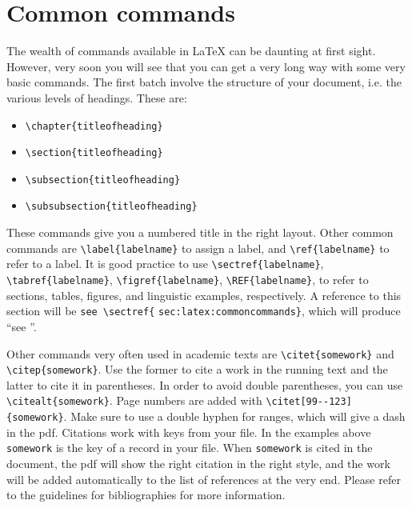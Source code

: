\section{Common commands}\label{sec:latex:commoncommands}
The wealth of commands available in \LaTeX\xspace can be daunting at first sight. However, very soon you will see that you can get a very long way with some very basic commands. The first batch involve the structure of your document, i.e. the various levels of headings. These are:
\begin{itemize}
\item \verb+\chapter{titleofheading}+
\item \verb+\section{titleofheading}+
\item \verb+\subsection{titleofheading}+
\item \verb+\subsubsection{titleofheading}+
\end{itemize}

These commands give you a numbered title in the right layout.
Other common commands are 
\verb+\label{labelname}+ 
to assign a label, and 
\verb+\ref{labelname}+
to refer to a label. It is good practice to use 
\verb+\sectref{labelname}+,
\verb+\tabref{labelname}+,
\verb+\figref{labelname}+,
\verb+\REF{labelname}+,
to refer to sections, tables, figures, and linguistic examples, respectively. A reference to this section will be \verb+see \sectref{+ \verb+sec:latex:commoncommands}+, which will produce ``see ''.

Other commands very often used in academic texts are \verb+\citet{somework}+ and \verb+\citep{somework}+. Use the former to cite a work in the running text and the latter to cite it in parentheses. In order to avoid double parentheses, you can use  \verb+\citealt{somework}+. Page numbers are added with \verb+\citet[99--123]{somework}+. Make sure to use a double hyphen for ranges, which will give a dash in the pdf. Citations work with keys from your \bibtex file. In the examples above \verb+somework+ is the key of a record in your \bibtex file. When \verb+somework+ is cited in the document, the pdf will show the right citation in the right style, and the work will be added automatically to the list of references at the very end. Please refer to the guidelines for bibliographies for more information.


